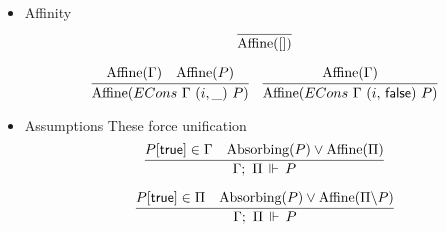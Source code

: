 \begin{itemize}
\item Affinity
  \[
  \infer{\Affine{[]}}{}
  \]

  \begin{equation*}
  \infer{\Affine{ECons\ \Gamma\ (i,\_)\ P}}
        {\Affine{\Gamma} &
         \Affine{P}
       }
  \quad
  \infer{\Affine{ECons\ \Gamma\ (i,\, \false)\ P}}
        {\Affine{\Gamma}}
  \end{equation*}
\item Assumptions
  These force unification
  \[
  \infer{\entailsD P}
        {P[\true] \in \IntuD &
         \Absorbing{P} \vee \Affine{\SpatD}}
  \]

 \[
  \infer{\entailsD P}
        {P[\true] \in \SpatD &
         \Absorbing{P} \vee \Affine{\SpatD \backslash P}}
 \]


\end{itemize}
